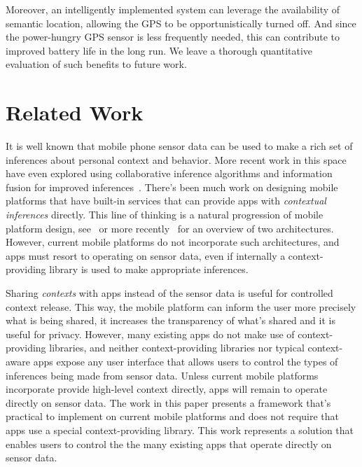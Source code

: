 \documentclass[10pt]{sensys-proc}
\begin{document}
Moreover, an intelligently implemented system can leverage the availability of semantic location, allowing the GPS to be opportunistically turned off. And since the power-hungry GPS sensor is less frequently needed, this can contribute to improved battery life in the long run. We leave a thorough quantitative evaluation of such benefits to future work.

\section{Related Work}
\label{Sec:related}
It is well known that mobile phone sensor data can be used to make a rich set of inferences about personal context and behavior. More recent work in this space have even explored using collaborative inference algorithms and information fusion for improved inferences~\cite{Miluzzo:DarwinPhones}. There's been much work on designing mobile platforms that have built-in services that can provide apps with \emph{contextual inferences} directly. This line of thinking is a natural progression of mobile platform design, see~\cite{Raento:ContextPhones} or more recently~\cite{Chu:CondOS} for an overview of two architectures. However, current mobile platforms do not incorporate such architectures, and apps must resort to operating on sensor data, even if internally a context-providing library is used to make appropriate inferences.

Sharing \emph{contexts} with apps instead of the sensor data is useful for controlled context release. This way, the mobile platform can inform the user more precisely what is being shared, it increases the transparency of what's shared and it is useful for privacy. However, many existing apps do not make use of context-providing libraries, and neither context-providing libraries nor typical context-aware apps expose any user interface that allows users to control the types of inferences being made from sensor data. Unless current mobile platforms incorporate provide high-level context directly, apps will remain to operate directly on sensor data. The work in this paper presents a framework that's practical to implement on current mobile platforms and does not require that apps use a special context-providing library. This work represents a solution that enables users to control the the many existing apps that operate directly on sensor data.
\end{document}
